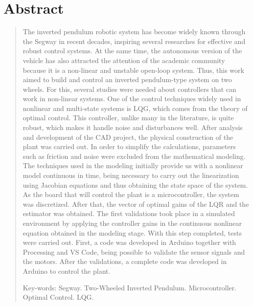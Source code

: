  \newpage

 \chapter*{Abstract}

 \vspace*{0.5cm}

 \begin{quotation}


 \noindent The inverted pendulum robotic system has become widely known through the Segway in recent decades, inspiring several researches for effective and robust control systems. At the same time, the autonomous version of the vehicle has also attracted the attention of the academic community because it is a non-linear and unstable open-loop system. Thus, this work aimed to build and control an inverted pendulum-type system on two wheels. For this, several studies were needed about controllers that can work in non-linear systems. One of the control techniques widely used in nonlinear and multi-state systems is LQG, which comes from the theory of optimal control. This controller, unlike many in the literature, is quite robust, which makes it handle noise and disturbances well. After analysis and development of the CAD project, the physical construction of the plant was carried out. In order to simplify the calculations, parameters such as friction and noise were excluded from the mathematical modeling. The techniques used in the modeling initially provide us with a nonlinear model continuous in time, being necessary to carry out the linearization using Jacobian equations and thus obtaining the state space of the system. As the board that will control the plant is a microcontroller, the system was discretized. After that, the vector of optimal gains of the LQR and the estimator was obtained. The first validations took place in a simulated environment by applying the controller gains in the continuous nonlinear equation obtained in the modeling stage. With this step completed, tests were carried out. First, a code was developed in Arduino together with Processing and VS Code, being possible to validate the sensor signals and the motors. After the validations, a complete code was developed in Arduino to control the plant.
 \vspace*{0.5cm}

 \noindent Key-words: Segway. Two-Wheeled Inverted Pendulum. Microcontroller. Optimal Control. LQG.
 \newpage%
 \end{quotation}
%

